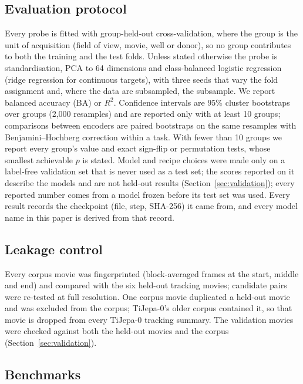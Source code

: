 \subsection{Evaluation protocol}
\label{sec:protocol}
Every probe is fitted with group-held-out cross-validation, where the group is the unit
of acquisition (field of view, movie, well or donor), so no group contributes to both the
training and the test folds. Unless stated otherwise the probe is standardisation,
PCA to 64 dimensions and class-balanced logistic regression (ridge regression for
continuous targets), with three seeds that vary the fold assignment and, where the data
are subsampled, the subsample. We report balanced accuracy (BA) or $R^2$. Confidence
intervals are 95\% cluster bootstraps over groups (2{,}000 resamples) and are reported
only with at least 10 groups; comparisons between encoders are paired bootstraps on the
same resamples with Benjamini--Hochberg correction within a task. With fewer than 10
groups we report every group's value and exact sign-flip or permutation tests, whose
smallest achievable $p$ is stated. Model and recipe choices were made only on a
label-free validation set that is never used as a test set; the scores reported on it
describe the models and are not held-out results (Section~\ref{sec:validation}); every reported number comes from a model frozen before its
test set was used. Every result records the checkpoint (file, step, SHA-256) it came from,
and every model name in this paper is derived from that record.

\subsection{Leakage control}
\label{sec:leakage}
Every corpus movie was fingerprinted (block-averaged frames at the start, middle and end)
and compared with the six held-out tracking movies; candidate pairs were re-tested at full
resolution. One corpus movie duplicated a held-out movie and was excluded from the corpus;
TiJepa-0's older corpus contained it, so that movie is dropped from every TiJepa-0
tracking summary. The validation movies were checked against both the held-out movies and
the corpus (Section~\ref{sec:validation}).

\subsection{Benchmarks}
